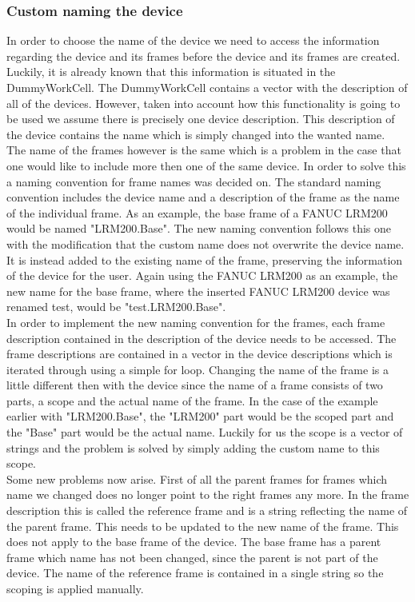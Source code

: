 \subsubsection{Custom naming the device}
In order to choose the name of the device we need to access the information regarding the device and its frames before the device and its frames are created. Luckily, it is already known that this information is situated in the DummyWorkCell. The DummyWorkCell contains a vector with the description of all of the devices. However, taken into account how this functionality is going to be used we assume there is precisely one device description. This description of the device contains the name which is simply changed into the wanted name.\\

The name of the frames however is the same which is a problem in the case that one would like to include more then one of the same device. In order to solve this a naming convention for frame names was decided on. The standard naming convention includes the device name and a description of the frame as the name of the individual frame. As an example, the base frame of a FANUC LRM200 would be named "LRM200.Base". The new naming convention follows this one with the modification that the custom name does not overwrite the device name. It is instead added to the existing name of the frame, preserving the information of the device for the user. Again using the FANUC LRM200 as an example, the new name for the base frame, where the inserted FANUC LRM200 device was renamed test, would be "test.LRM200.Base".\\

In order to implement the new naming convention for the frames, each frame description contained in the description of the device needs to be accessed. The frame descriptions are contained in a vector in the device descriptions which is iterated through using a simple for loop. Changing the name of the frame is a little different then with the device since the name of a frame consists of two parts, a scope and the actual name of the frame. In the case of the example earlier with "LRM200.Base", the "LRM200" part would be the scoped part and the "Base" part would be the actual name. Luckily for us the scope is a vector of strings and the problem is solved by simply adding the custom name to this scope.\\

Some new problems now arise. First of all the parent frames for frames which name we changed does no longer point to the right frames any more. In the frame description this is called the reference frame and is a string reflecting the name of the parent frame. This needs to be updated to the new name of the frame. This does not apply to the base frame of the device. The base frame has a parent frame which name has not been changed, since the parent is not part of the device. The name of the reference frame is contained in a single string so the scoping is applied manually.\\


